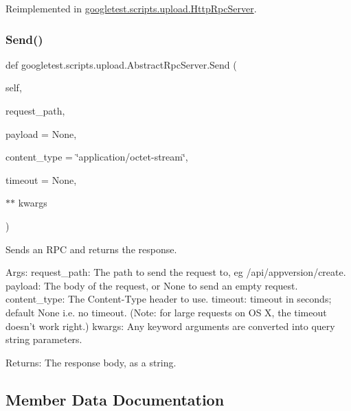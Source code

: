 Reimplemented in \mbox{\hyperlink{classgoogletest_1_1scripts_1_1upload_1_1_http_rpc_server_aaed250eb0837a8f3b5d7ac5a25faef2e}{googletest.\+scripts.\+upload.\+Http\+Rpc\+Server}}.

\mbox{\label{classgoogletest_1_1scripts_1_1upload_1_1_abstract_rpc_server_a2d5933bff99163c58b94074e819af422}} 
\subsubsection{\texorpdfstring{Send()}{Send()}}
{\footnotesize\ttfamily def googletest.\+scripts.\+upload.\+Abstract\+Rpc\+Server.\+Send (\begin{DoxyParamCaption}\item[{}]{self,  }\item[{}]{request\+\_\+path,  }\item[{}]{payload = {\ttfamily None},  }\item[{}]{content\+\_\+type = {\ttfamily \char`\"{}application/octet-\/stream\char`\"{}},  }\item[{}]{timeout = {\ttfamily None},  }\item[{$\ast$$\ast$}]{kwargs }\end{DoxyParamCaption})}

\begin{DoxyVerb}Sends an RPC and returns the response.

Args:
  request_path: The path to send the request to, eg /api/appversion/create.
  payload: The body of the request, or None to send an empty request.
  content_type: The Content-Type header to use.
  timeout: timeout in seconds; default None i.e. no timeout.
(Note: for large requests on OS X, the timeout doesn't work right.)
  kwargs: Any keyword arguments are converted into query string parameters.

Returns:
  The response body, as a string.
\end{DoxyVerb}
 

\subsection{Member Data Documentation}
\mbox{\label{classgoogletest_1_1scripts_1_1upload_1_1_abstract_rpc_server_ac6af7f7d28ac4e5770ab85a27a2e6452}} 
